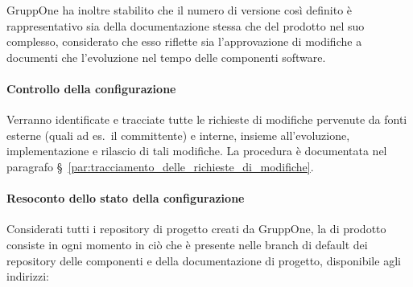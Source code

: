 \documentclass[../../norme-di-progetto.tex]{subfiles}
\begin{document}
GruppOne ha inoltre stabilito che il numero di versione così definito è rappresentativo sia della documentazione stessa che del prodotto nel suo complesso, considerato che esso riflette sia l'approvazione di modifiche a documenti che l'evoluzione nel tempo delle componenti software.








\paragraph{Controllo della configurazione}%
\label{par:controllo_della_configurazione}

Verranno identificate e tracciate tutte le richieste di modifiche pervenute da fonti esterne (quali ad es.\ il committente) e interne, insieme all'evoluzione, implementazione e rilascio di tali modifiche.
La procedura è documentata nel paragrafo §~\ref{par:tracciamento_delle_richieste_di_modifiche}.


\paragraph{Resoconto dello stato della configurazione}%
\label{par:resoconto_dello_stato_della_configurazione}

Considerati tutti i repository di progetto creati da GruppOne, la  di prodotto consiste in ogni momento in ciò che è presente nelle branch di default dei repository delle componenti e della documentazione di progetto, disponibile agli indirizzi:
\end{document}
